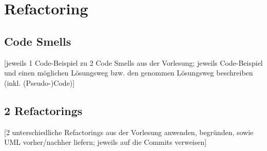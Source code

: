 \chapter{Refactoring}

\section{Code Smells}
[jeweils 1 Code-Beispiel zu 2 Code Smells aus der Vorlesung; jeweils Code-Beispiel und einen möglichen Lösungsweg bzw. den genommen Lösungsweg beschreiben (inkl. (Pseudo-)Code)]

\section{2 Refactorings}
[2 unterschiedliche Refactorings aus der Vorlesung anwenden, begründen, sowie UML vorher/nachher liefern; jeweils auf die Commits verweisen]
